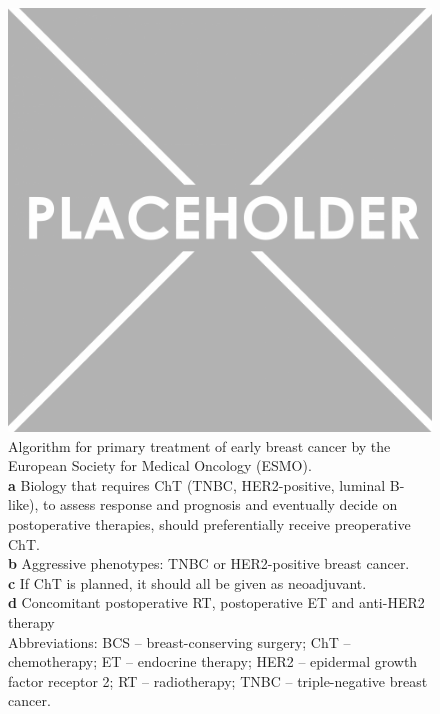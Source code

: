 \documentclass[11pt]{book}
\begin{document}
\begin{figure}
\includegraphics[scale=0.3]{img/placeholder.png}
\caption[ESMO Primary Treatment Algorithm]{Algorithm for primary treatment of early breast cancer by the European Society for Medical Oncology (ESMO). \\
\textbf{a} Biology that requires ChT (TNBC, HER2-positive, luminal B-like), to assess response and prognosis and eventually decide on postoperative
therapies, should preferentially receive preoperative ChT. \\
\textbf{b} Aggressive phenotypes: TNBC or HER2-positive breast cancer. \\
\textbf{c} If ChT is planned, it should all be given as neoadjuvant. \\ 
\textbf{d} Concomitant postoperative RT, postoperative ET and anti-HER2 therapy \\
Abbreviations: BCS -- breast-conserving surgery; ChT -- chemotherapy; ET -- endocrine therapy; HER2 -- epidermal growth factor receptor 2; RT -- radiotherapy; TNBC -- triple-negative breast cancer.}
\label{fig:primary-treatments}
\end{figure}
\end{document}
